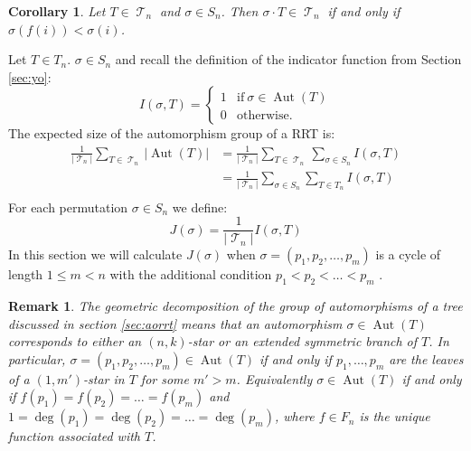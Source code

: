 \documentclass[oneside]{book} %
\newtheorem{remk}{Remark}
\newtheorem{cor}[thm]{Corollary}
\theoremstyle{definition}
\numberwithin{equation}{section}
\DeclareMathOperator{\Aut}{Aut} %
\DeclareMathOperator{\T}{\mathcal{T}}
\begin{document}
\begin{cor}\label{cor:sig}
Let $T \in \T_n$ and $ \sigma \in S_n$.  Then  $\sigma  \cdot T \in \T_n$ if and only if $\sigma(f(i)) < \sigma(i) $. 
\end{cor}


Let $T \in T_n$. $\sigma \in S_n$ and recall the definition of the indicator function from Section \ref{sec:yo}:
\[
 I(\sigma,T) = \begin{cases}
                1 & \text{if}\ \sigma \in \Aut(T) \\
                0 & \text{otherwise.}
               \end{cases}
\]
The expected size of the automorphism group of a RRT is:
\begin{align}
 \frac{1}{\lvert\T_n\rvert}\sum_{T \in \T_n} \lvert \Aut(T) \rvert &=  \frac{1}{\lvert\T_n\rvert}\sum_{T \in \T_n}\sum_{\sigma \in S_n}I(\sigma,T) \\
 &=   \frac{1}{\lvert\T_n\rvert}\sum_{\sigma \in S_n}\sum_{T \in T_n}I(\sigma,T) \\
\end{align}
For each permutation $\sigma \in S_n$ we define:
\[
 J(\sigma) = \frac{1}{\lvert \T_n \rvert}I(\sigma,T)
\]
In this section we will calculate $J(\sigma)$ when $\sigma = (p_1,p_2,\dots,p_m)$ is a cycle of length $1 \leq m<n$ with the additional condition $p_1< p_2<\dots< p_m$ .

\begin{remk}\label{remk:1}
 The geometric decomposition of the group of automorphisms of a tree discussed in section \ref{sec:aorrt} means that an
 automorphism $\sigma \in \Aut(T)$ corresponds to either an $(n,k)$-star or an extended symmetric branch of $T$.  In 
 particular, $\sigma = (p_1,p_2,\dots,p_m) \in \Aut(T)$ if and only if $p_1,\dots,p_m$ are the leaves of a $(1,m')$-star 
 in $T$ for some $m' > m$. Equivalently $\sigma \in \Aut(T)$ if and only if $f(p_1) = f(p_2) = \dots = f(p_m)$ and 
 $1 = \deg(p_1) = \deg(p_2) = \dots = \deg(p_m)$, where $f\in F_n$ is the unique function associated with $T$.   
\end{remk}
\end{document}
